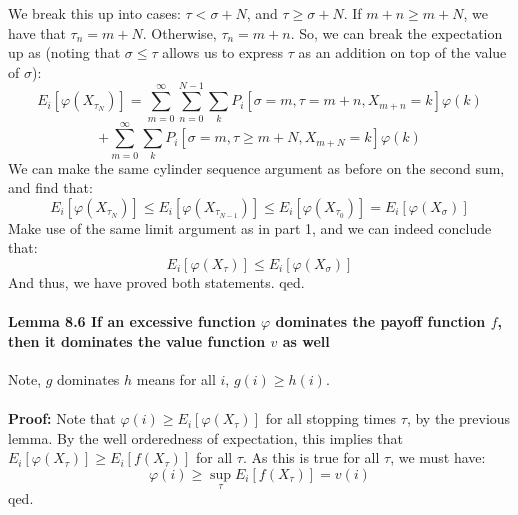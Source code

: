 \documentclass[12pt,a4paper]{article}
\newcommand{\1}[1]{\mathbbm{1}\left\{ #1 \right\}}
\begin{document}
We break this up into cases: $\tau < \sigma + N$, and $\tau \geq \sigma + N$. If $m + n \geq m + N$, we have that $\tau_n = m + N$. Otherwise, $\tau_n = m + n$. So, we can break the expectation up as (noting that $\sigma \leq \tau$ allows us to express $\tau$ as an addition on top of the value of $\sigma$):
$$
	E_i\left[\varphi(X_{\tau_N})\right] =
	\sum_{m=0}^\infty \sum_{n=0}^{N - 1} \sum_k P_i\left[\sigma = m, \tau = m + n, X_{m + n} = k\right]\varphi(k)
$$
$$
	+
	\sum_{m=0}^\infty \sum_k P_i\left[\sigma = m, \tau \geq m + N, X_{m + N} = k\right]\varphi(k)
$$
We can make the same cylinder sequence argument as before on the second sum, and find that:
$$
	E_i\left[\varphi(X_{\tau_N})\right] \leq
	E_i\left[\varphi(X_{\tau_{N-1}})\right] \leq E_i\left[\varphi(X_{\tau_0})\right] = E_i\left[\varphi(X_\sigma)\right]
$$
Make use of the same limit argument as in part 1, and we can indeed conclude that:
$$
	E_i\left[\varphi(X_\tau)\right] \leq E_i\left[\varphi(X_\sigma)\right]
$$
And thus, we have proved both statements. qed.

\paragraph{Lemma 8.6 If an excessive function $\varphi$ dominates the payoff function $f$, then it dominates the value function $v$ as well} Note, $g$ dominates $h$ means for all $i$, $g(i) \geq h(i)$.
\\\\
\textbf{Proof:} Note that $\varphi(i) \geq E_i\left[\varphi(X_\tau)\right]$ for all stopping times $\tau$, by the previous lemma. By the well orderedness of expectation, this implies that $E_i\left[\varphi(X_\tau)\right] \geq E_i\left[f(X_\tau)\right]$ for all $\tau$. As this is true for all $\tau$, we must have:
$$
	\varphi(i) \geq \sup_\tau E_i\left[f(X_\tau)\right] = v(i)
$$
qed.
\end{document}
